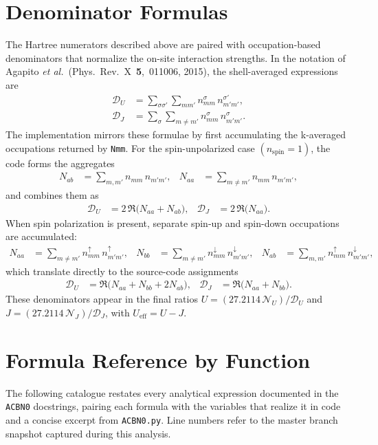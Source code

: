 \documentclass[11pt]{article}
\begin{document}
\section{Denominator Formulas}
\label{sec:denoms}
The Hartree numerators described above are paired with occupation-based denominators that normalize the on-site interaction strengths. In the notation of Agapito \emph{et al.}\ (Phys.~Rev.~X~\textbf{5},~011006, 2015), the shell-averaged expressions are
\begin{align}
  \mathcal{D}_U &= \sum_{\sigma\sigma'} \sum_{m m'} n^{\sigma}_{mm} \, n^{\sigma'}_{m'm'}, \\[2pt]
  \mathcal{D}_J &= \sum_{\sigma} \sum_{m \ne m'} n^{\sigma}_{mm} \, n^{\sigma}_{m' m'}.
\end{align}
The implementation mirrors these formulae by first accumulating the k-averaged occupations returned by \texttt{Nmm}. For the spin-unpolarized case \((n_{\text{spin}}=1)\), the code forms the aggregates
\begin{align}
  N_{ab} &= \sum_{m,m'} n_{mm} \, n_{m'm'}, &
  N_{aa} &= \sum_{m \ne m'} n_{mm} \, n_{m'm'},
\end{align}
and combines them as
\begin{align}
  \mathcal{D}_U &= 2\,\Re\bigl(N_{aa} + N_{ab}\bigr), &
  \mathcal{D}_J &= 2\,\Re\bigl(N_{aa}\bigr).
\end{align}
When spin polarization is present, separate spin-up and spin-down occupations are accumulated:
\begin{align}
  N_{aa} &= \sum_{m \ne m'} n^{\uparrow}_{mm} \, n^{\uparrow}_{m'm'}, &
  N_{bb} &= \sum_{m \ne m'} n^{\downarrow}_{mm} \, n^{\downarrow}_{m'm'}, &
  N_{ab} &= \sum_{m,m'} n^{\uparrow}_{mm} \, n^{\downarrow}_{m'm'},
\end{align}
which translate directly to the source-code assignments
\begin{align}
  \mathcal{D}_U &= \Re\bigl(N_{aa} + N_{bb} + 2 N_{ab}\bigr), &
  \mathcal{D}_J &= \Re\bigl(N_{aa} + N_{bb}\bigr).
\end{align}
These denominators appear in the final ratios
\( U = (27.2114\,\mathcal{N}_U) / \mathcal{D}_U \) and \( J = (27.2114\,\mathcal{N}_J) / \mathcal{D}_J \), with \(U_{\text{eff}} = U - J\).

\section{Formula Reference by Function}
The following catalogue restates every analytical expression documented in the \texttt{ACBN0} docstrings, pairing each formula with the variables that realize it in code and a concise excerpt from \texttt{ACBN0.py}. Line numbers refer to the master branch snapshot captured during this analysis.
\end{document}
